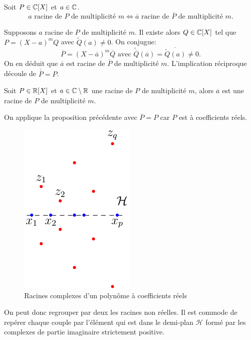 \begin{prop}
 Soit $P\in \mathbb{C}[X]$ et $a\in \mathbb{C}$.
\[
  a \text{ racine de $P$ de multiplicité } m \Leftrightarrow \overline{a} \text{ racine de $\overline{P}$ de multiplicité } m .
\]
\end{prop}
\begin{demo}
Supposons $a$ racine de $P$ de multiplicité $m$. Il existe alors $Q \in \mathbb{C}[X]$ tel que $P = (X-a)^m Q$ avec $\widetilde{Q}(a)\neq 0$. On conjugue:
\[
  \overline{P} = (X- \overline{a})^m \overline{Q} \text{ avec } \widetilde{\overline{Q}}(\overline{a}) = \overline{\widetilde{Q}(a)}\neq 0.
\]
On en déduit que $\overline{a}$ est racine de $\overline{P}$ de multiplicité $m$. L'implication réciproque découle de $\overline{\overline{P}} = P$.
\end{demo}

\begin{prop}
 Soit $P\in \mathbb{R}[X]$ et $a\in \mathbb{C}\setminus \mathbb{R}$ une racine de $P$ de multiplicité $m$, alors $\overline{a}$ est une racine de $P$ de multiplicité $m$.
\end{prop}
\begin{demo}
 On applique la proposition précédente avec $\overline{P}=P$ car $P$ est à coefficients réels.
\end{demo}

\begin{figure}[ht]{}
 \centering
 \includegraphics{C2159_1.pdf}
 \caption{Racines complexes d'un polynôme à coefficients réels}
 \label{fig:C2159_1}
\end{figure}

\begin{rem}
 On peut donc regrouper par deux les racines non réelles. Il est commode de repérer chaque couple par l'élément qui est dans le demi-plan $\mathcal H$ formé par les complexes de partie imaginaire strictement positive.
\end{rem}


